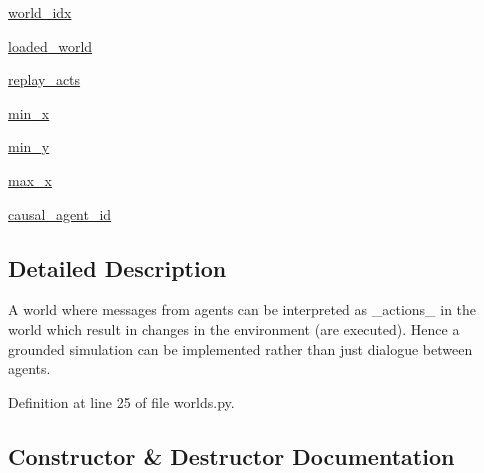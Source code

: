 \begin{DoxyCompactItemize}
\item 
\hyperlink{classparlai_1_1mturk_1_1tasks_1_1talkthewalk_1_1worlds_1_1TalkTheWalkWorld_accdd40d13555e0b8a176d231516787e7}{world\+\_\+idx}
\item 
\hyperlink{classparlai_1_1mturk_1_1tasks_1_1talkthewalk_1_1worlds_1_1TalkTheWalkWorld_a0bc364a0da29e44f84ffeafa0705284c}{loaded\+\_\+world}
\item 
\hyperlink{classparlai_1_1mturk_1_1tasks_1_1talkthewalk_1_1worlds_1_1TalkTheWalkWorld_acf3ae52f81d26805366899e552c602f3}{replay\+\_\+acts}
\item 
\hyperlink{classparlai_1_1mturk_1_1tasks_1_1talkthewalk_1_1worlds_1_1TalkTheWalkWorld_a052a53941b53e0cc5cf2494d8a78d24a}{min\+\_\+x}
\item 
\hyperlink{classparlai_1_1mturk_1_1tasks_1_1talkthewalk_1_1worlds_1_1TalkTheWalkWorld_a62b94a1c38611e9c7db1dfb9dcb1da69}{min\+\_\+y}
\item 
\hyperlink{classparlai_1_1mturk_1_1tasks_1_1talkthewalk_1_1worlds_1_1TalkTheWalkWorld_aec3ffde8ab0a1ba2fd964155667047fa}{max\+\_\+x}
\item 
\hyperlink{classparlai_1_1mturk_1_1tasks_1_1talkthewalk_1_1worlds_1_1TalkTheWalkWorld_ac4bfaadcf06926e60538ea1cbe39136a}{causal\+\_\+agent\+\_\+id}
\end{DoxyCompactItemize}


\subsection{Detailed Description}
\begin{DoxyVerb}A world where messages from agents can be interpreted as _actions_ in the
world which result in changes in the environment (are executed). Hence a
grounded simulation can be implemented rather than just dialogue between
agents.
\end{DoxyVerb}
 

Definition at line 25 of file worlds.\+py.



\subsection{Constructor \& Destructor Documentation}
\mbox{\label{classparlai_1_1mturk_1_1tasks_1_1talkthewalk_1_1worlds_1_1TalkTheWalkWorld_a2bf246c349a56c3dc43e1caff2241c3b}} 
